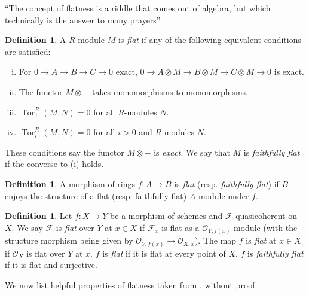 \documentclass{amsart}
\DeclareMathOperator{\Tor}{Tor}
\theoremstyle{definition}
\newtheorem{definition}[theorem]{Definition}
\theoremstyle{remark}
\begin{document}
\begin{displayquote}
    ``The concept of flatness is a riddle that comes out of algebra, but which
    technically is the answer to many prayers''
\end{displayquote}

\begin{definition}
    A $R$-module $M$ is \textit{flat} if any of the following equivalent
    conditions are satisfied:
    \begin{enumerate}[(i)]
        \item For $0 \to A \to B \to C \to 0$ exact, $0 \to A \otimes M \to B
            \otimes M \to C \otimes M \to 0$ is exact.
        \item The functor $M \otimes {-}$ takes monomorphisms to monomorphisms.
        \item $\Tor^R_1(M, N) = 0$ for all $R$-modules $N$.
        \item $\Tor^R_i(M, N) = 0$ for all $i > 0$ and $R$-modules $N$.
    \end{enumerate}
    These conditions say the functor $M \otimes {-}$ is \textit{exact}. We say
    that $M$ is \textit{faithfully flat} if the converse to (i) holds.
\end{definition}

\begin{definition}
    A morphism of rings $f : A \to B$ is \textit{flat} (resp. \textit{faithfully
        flat}) if $B$ enjoys the structure of a flat (resp. faithfully flat)
    $A$-module under $f$.
\end{definition}

\begin{definition}
    Let $f : X \to Y$ be a morphism of schemes and $\mathcal{F}$ quasicoherent
    on $X$. We say $\mathcal{F}$ is \textit{flat} over $Y$ at $x \in X$ if
    $\mathcal{F}_x$ is flat as a $\mathcal{O}_{Y, f(x)}$ module (with the
    structure morphism being given by $\mathcal{O}_{Y, f(x)} \to \mathcal{O}_{X,
        x}$). The map $f$ is \textit{flat} at $x \in X$ if $\mathcal{O}_X$ is
    flat over $Y$ at $x$. $f$ is \textit{flat} if it is flat at every point of
    $X$. $f$ is \textit{faithfully flat} if it is flat and surjective.
\end{definition}

We now list helpful properties of flatness taken from \cite{MorphismNotes},
without proof.
\end{document}
